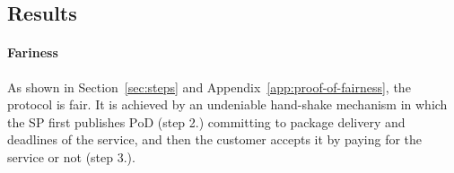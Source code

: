 \noindent%
\begin{minipage}{\linewidth}%
\label{fig:anonser-experiment2}%
\end{minipage}
\subsection{Results}


\paragraph{Fariness}
As shown in Section~\ref{sec:steps} and Appendix~\ref{app:proof-of-fairness}, 
the protocol is fair. It is achieved by an undeniable hand-shake mechanism in which the SP first publishes $\mathrm{PoD}$ (step 2.) committing to package delivery and deadlines of the service, and then the customer accepts it by paying for the service or not (step 3.).

